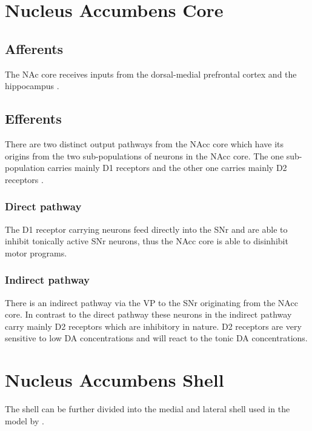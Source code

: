 \documentclass[12pt,a4paper]{article}
\begin{document}
\section{Nucleus Accumbens Core}

\subsection{Afferents}

The NAc core receives inputs from the dorsal-medial prefrontal cortex and the hippocampus \citep{brog93}.

\subsection{Efferents}

There are two distinct output pathways from the NAcc core which have its origins from the two sub-populations of neurons in the NAcc core. The one sub-population carries mainly D1 receptors and the other one carries mainly D2 receptors \citep{kelley04} \citep{Humphries2010}. 

\subsubsection{Direct pathway}

The D1 receptor carrying neurons feed directly into the SNr and are able to inhibit tonically active SNr neurons, thus the NAcc core is able to disinhibit motor programs. 

\subsubsection{Indirect pathway}

There is an indirect pathway via the VP to the SNr originating from the NAcc core. In contrast to the direct pathway these neurons in the indirect pathway carry mainly D2 receptors which are inhibitory in nature. D2 receptors are very sensitive to low DA concentrations and will react to the tonic DA concentrations. 




\section{Nucleus Accumbens Shell}

The shell can be further divided into the medial and lateral shell \citep{Ikemoto2007} \citep{Usuda1998} used in the model by \citep{Humphries2010}.
\end{document}
